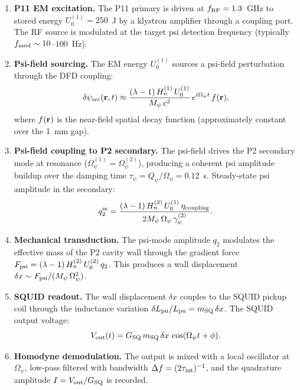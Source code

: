 \documentclass[11pt,twocolumn]{article}
\newcommand{\dpsi}{\delta\psi}
\newcommand{\lam}{\lambda}
\newcommand{\Opsi}{\Omega_\psi}
\newcommand{\gpsi}{\gamma_\psi}
\newcommand{\Mpsi}{M_\psi}
\newcommand{\Qpsi}{Q_\psi}
\newcommand{\Heff}{H_n}
\theoremstyle{definition}
\theoremstyle{remark}
\begin{document}
\begin{enumerate}[leftmargin=*,label=\textbf{Step \arabic*:}]

\item \textbf{P11 EM excitation.} The P11 primary is driven at
$f_{\rm RF} = 1.3$~GHz to stored energy $U_0^{(1)} = 250$~J by a klystron
amplifier through a coupling port. The RF source is modulated at the
target psi detection frequency (typically $f_{\rm mod} \sim 10$--$100$~Hz).

\item \textbf{Psi-field sourcing.} The EM energy $U_0^{(1)}$ sources a psi-field
perturbation through the DFD coupling:
\begin{equation}
\dpsi_{\rm src}({\bf r},t) \approx \frac{(\lam-1)\,\Heff^{(1)}\,U_0^{(1)}}
{\Mpsi\,c^2}\,e^{i\Opsi t}\,f({\bf r}),
\label{eq:step2}
\end{equation}
where $f({\bf r})$ is the near-field spatial decay function (approximately
constant over the 1~mm gap).

\item \textbf{Psi-field coupling to P2 secondary.} The psi-field drives the P2
secondary mode at resonance ($\Opsi^{(1)} = \Opsi^{(2)}$), producing a coherent
psi amplitude buildup over the damping time $\tau_\psi = \Qpsi/\Opsi = 0.12$~s.
Steady-state psi amplitude in the secondary:
\begin{equation}
q_2^{\rm ss} = \frac{(\lam-1)\,\Heff^{(2)}\,U_0^{(1)}\,\eta_{\rm coupling}}
{2\Mpsi\,\Opsi\,\gpsi^{(2)}}.
\label{eq:step3}
\end{equation}

\item \textbf{Mechanical transduction.} The psi-mode amplitude $q_2$ modulates
the effective mass of the P2 cavity wall through the gradient force
$F_{\rm psi} = (\lam-1)\,\Heff^{(2)}\,U_0^{(2)}\,q_2$. This produces
a wall displacement $\delta x \sim F_{\rm psi}/(\Mpsi\,\Opsi^2)$.

\item \textbf{SQUID readout.} The wall displacement $\delta x$ couples to the
SQUID pickup coil through the inductance variation
$\delta L_{\rm pu}/L_{\rm pu} = m_{\rm SQ}\,\delta x$.
The SQUID output voltage:
\begin{equation}
V_{\rm out}(t) = G_{\rm SQ}\,m_{\rm SQ}\,\delta x\,\cos(\Opsi t + \phi).
\label{eq:step5}
\end{equation}

\item \textbf{Homodyne demodulation.} The output is mixed with a local oscillator
at $\Opsi$, low-pass filtered with bandwidth $\Delta f = (2\tau_{\rm int})^{-1}$,
and the quadrature amplitude $I = V_{\rm out}/G_{\rm SQ}$ is recorded.


\end{enumerate}
\end{document}
